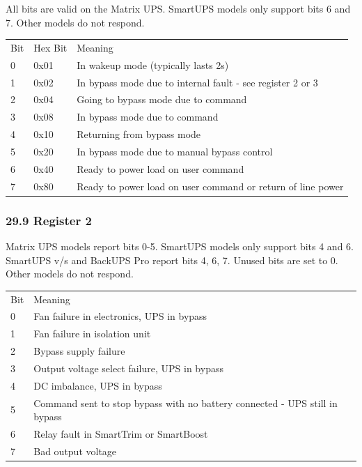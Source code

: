 {{{{{{{{{{{{{{{{{All bits are valid on the Matrix UPS. SmartUPS models only support bits 6 and
7. Other models do not respond.  

\begin{longtable}{p{0.3in}p{0.5in}p{4.2in}}
{Bit} & {Hex Bit} & {Meaning 
 } \\
{0} & {0x01} & {In wakeup mode (typically lasts \lt{} 2s) 
 } \\
{1} & {0x02} & {In bypass mode due to internal fault - see register 2 or 3 
 } \\
{2} & {0x04} & {Going to bypass mode due to command 
 } \\
{3} & {0x08} & {In bypass mode due to command 
 } \\
{4} & {0x10} & {Returning from bypass mode 
 } \\
{5} & {0x20} & {In bypass mode due to manual bypass control 
 } \\
{6} & {0x40} & {Ready to power load on user command 
 } \\
{7} & {0x80} & {Ready to power load on user command or return of line power  
}

\end{longtable}

\label{Register-2}

\subsubsection*{29.9 Register 2}

Matrix UPS models report bits 0-5. SmartUPS models only support bits 4 and 6.
SmartUPS v/s and BackUPS Pro report bits 4, 6, 7. Unused bits are set to 0.
Other models do not respond.  

\begin{longtable}{p{0.3in}p{4.7in}}
{Bit} & {Meaning 
 } \\
{0} & {Fan failure in electronics, UPS in bypass 
 } \\
{1} & {Fan failure in isolation unit 
 } \\
{2} & {Bypass supply failure 
 } \\
{3} & {Output voltage select failure, UPS in bypass 
 } \\
{4} & {DC imbalance, UPS in bypass 
 } \\
{5} & {Command sent to stop bypass with no battery connected - UPS still in
bypass 
 } \\
{6} & {Relay fault in SmartTrim or SmartBoost 
 } \\
{7} & {Bad output voltage  
}


\end{longtable}}}}}}}}}}}}}}}}}}
